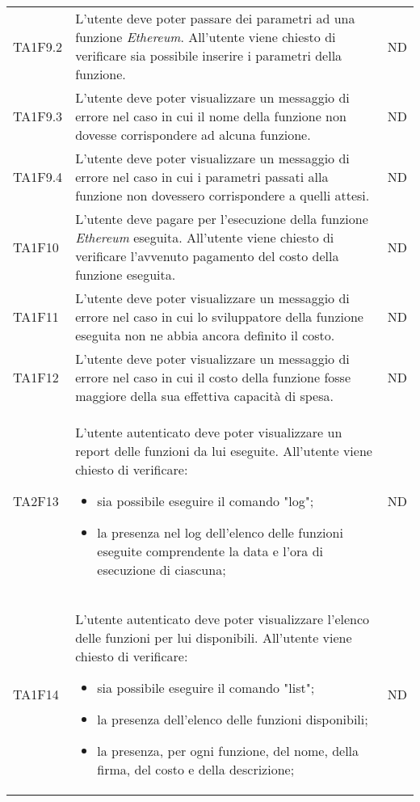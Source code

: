 \begin{longtable}{|C{1.5cm}|C{10cm}|C{1.5cm}|}
	TA1F9.2  &
	L’utente deve poter passare dei parametri ad una funzione \textit{Ethereum\glos}. All’utente viene chiesto di verificare sia possibile inserire i parametri della funzione. &
	ND \\

	TA1F9.3  &
	L’utente deve poter visualizzare un messaggio di errore nel caso in cui il nome della funzione non dovesse corrispondere ad alcuna funzione. &
	ND \\

	TA1F9.4  &
	L’utente deve poter visualizzare un messaggio di errore nel caso in cui i parametri passati alla funzione non dovessero corrispondere a quelli attesi. &
	ND \\

	TA1F10  &
	L’utente deve pagare per l'esecuzione della funzione \textit{Ethereum\glos} eseguita.
	All’utente viene chiesto di verificare l'avvenuto pagamento del costo della funzione eseguita. &
	ND \\

	TA1F11  &
	L’utente deve poter visualizzare un messaggio di errore nel caso in cui lo sviluppatore della funzione eseguita non ne abbia ancora definito il costo. &
	ND \\

	TA1F12  &
	L’utente deve poter visualizzare un messaggio di errore nel caso in cui il costo della funzione fosse maggiore della sua effettiva capacità di spesa. &
	ND \\

	TA2F13  &
	L’utente autenticato deve poter visualizzare un report delle funzioni da lui eseguite. All’utente viene chiesto di verificare:
	\begin{itemize}
		\item sia possibile eseguire il comando "log";
		\item la presenza nel log dell'elenco delle funzioni eseguite comprendente la data e l'ora di esecuzione di ciascuna;
	\end{itemize} &
	ND \\[-5ex]

	TA1F14  &
	L’utente autenticato deve poter visualizzare l'elenco delle funzioni per lui disponibili. All’utente viene chiesto di verificare:
	\begin{itemize}
		\item sia possibile eseguire il comando "list";
		\item la presenza dell'elenco delle funzioni disponibili;
		\item la presenza, per ogni funzione, del nome, della firma, del costo e della descrizione;
	\end{itemize} &
	ND \\[-5ex]


\end{longtable}
